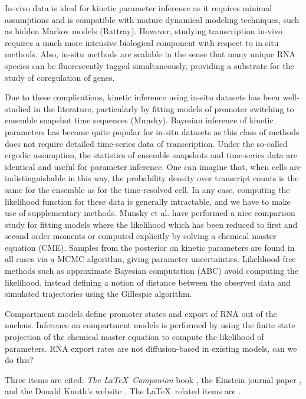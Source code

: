 \documentclass{article}
\begin{document}
In-vivo data is ideal for kinetic parameter inference as it requires minimal assumptions and is compatible with mature dynamical modeling techniques, such as hidden Markov models (Rattray). However, studying transcription in-vivo requires a much more intensive biological component with respect to in-situ methods. Also, in-situ methods are scalable in the sense that many unique RNA species can be fluorescently tagged simultaneously, providing a substrate for the study of coregulation of genes.

Due to these complications, kinetic inference using  in-situ datasets has been well-studied in the literature, particularly by fitting models of promoter switching to ensemble snapshot time sequences (Munsky). Bayesian inference of kinetic parameters has become quite popular for in-situ datasets as this class of methods does not require detailed time-series data of transcription. Under the so-called ergodic assumption, the statistics of ensemble snapshots and time-series data are identical and useful for parameter inference. One can imagine that, when cells are indistinguishable in this way, the probability density over transcript counts is the same for the ensemble as for the time-resolved cell. In any case, computing the likelihood function for these data is generally intractable, and we have to make use of supplementary methods. Munsky et al. have performed a nice comparison study for fitting models where the likelihood which has been reduced to first and second order moments or computed explicitly by solving a chemical master equation (CME). Samples from the posterior on kinetic parameters are found in all cases via a MCMC algorithm, giving parameter uncertainties. Likelihood-free methods such as approximate Bayesian computation (ABC) avoid computing the likelihood, instead defining a notion of distance between the observed data and simulated trajectories using the Gillespie algorithm.


Compartment models define promoter states and export of RNA out of the nucleus. Inference on compartment models is performed by using the finite state projection of the chemical master equation to compute the likelihood of parameters. RNA export rates are not diffusion-based in existing models, can we do this?  

Three items are cited: \textit{The \LaTeX\ Companion} book \cite{latexcompanion}, the Einstein journal paper \citet{einstein}, and the 
Donald Knuth's website \cite{knuthwebsite}. The \LaTeX\ related items are
\cite{latexcompanion,knuthwebsite}.  
\end{document}
